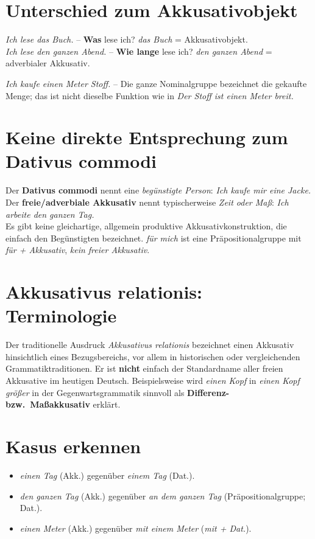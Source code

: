 \documentclass[a4paper,11pt]{article}
\begin{document}
\section{Unterschied zum Akkusativobjekt}
\textit{Ich lese das Buch.} -- \textbf{Was} lese ich? \textit{das Buch} = Akkusativobjekt.\\
\textit{Ich lese den ganzen Abend.} -- \textbf{Wie lange} lese ich? \textit{den ganzen Abend} = adverbialer Akkusativ.

\textit{Ich kaufe einen Meter Stoff.} -- Die ganze Nominalgruppe bezeichnet die gekaufte Menge; das ist nicht dieselbe Funktion wie in \textit{Der Stoff ist einen Meter breit.}

\section{Keine direkte Entsprechung zum Dativus commodi}
Der \textbf{Dativus commodi} nennt eine \emph{begünstigte Person}: \textit{Ich kaufe mir eine Jacke.}\\
Der \textbf{freie/adverbiale Akkusativ} nennt typischerweise \emph{Zeit oder Maß}: \textit{Ich arbeite den ganzen Tag.}\\
Es gibt keine gleichartige, allgemein produktive Akkusativkonstruktion, die einfach den Begünstigten bezeichnet. \textit{für mich} ist eine Präpositionalgruppe mit \textit{für + Akkusativ}, \emph{kein freier Akkusativ}.

\section{Akkusativus relationis: Terminologie}
Der traditionelle Ausdruck \textit{Akkusativus relationis} bezeichnet einen Akkusativ hinsichtlich eines Bezugsbereichs, vor allem in historischen oder vergleichenden Grammatiktraditionen. Er ist \textbf{nicht} einfach der Standardname aller freien Akkusative im heutigen Deutsch. Beispielsweise wird \textit{einen Kopf} in \textit{einen Kopf größer} in der Gegenwartsgrammatik sinnvoll als \textbf{Differenz- bzw.\ Maßakkusativ} erklärt.

\section{Kasus erkennen}
\begin{itemize}
\item \textit{einen Tag} (Akk.) gegenüber \textit{einem Tag} (Dat.).
\item \textit{den ganzen Tag} (Akk.) gegenüber \textit{an dem ganzen Tag} (Präpositionalgruppe; Dat.).
\item \textit{einen Meter} (Akk.) gegenüber \textit{mit einem Meter} (\textit{mit + Dat.}).
\end{itemize}
\end{document}
